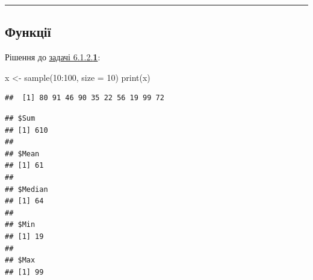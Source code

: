 \documentclass[
]{book}
\newenvironment{Shaded}{\begin{snugshade}}{\end{snugshade}}
\newcommand{\AttributeTok}[1]{\textcolor[rgb]{0.77,0.63,0.00}{#1}}
\newcommand{\ControlFlowTok}[1]{\textcolor[rgb]{0.13,0.29,0.53}{\textbf{#1}}}
\newcommand{\DecValTok}[1]{\textcolor[rgb]{0.00,0.00,0.81}{#1}}
\newcommand{\FunctionTok}[1]{\textcolor[rgb]{0.00,0.00,0.00}{#1}}
\newcommand{\NormalTok}[1]{#1}
\newcommand{\OtherTok}[1]{\textcolor[rgb]{0.56,0.35,0.01}{#1}}
\newcommand{\SpecialCharTok}[1]{\textcolor[rgb]{0.00,0.00,0.00}{#1}}
\begin{document}
\begin{center}\rule{0.5\linewidth}{0.5pt}\end{center}

\hypertarget{chapter622}{%
\subsection{Функції}\label{chapter622}}

Рішення до \protect\hyperlink{task6121}{задачі 6.1.2.\textbf{1}}:

\begin{Shaded}
\begin{Highlighting}[]
\NormalTok{x }\OtherTok{\textless{}{-}} \FunctionTok{sample}\NormalTok{(}\DecValTok{10}\SpecialCharTok{:}\DecValTok{100}\NormalTok{, }\AttributeTok{size =} \DecValTok{10}\NormalTok{)}
\FunctionTok{print}\NormalTok{(x)}
\end{Highlighting}
\end{Shaded}

\begin{verbatim}
##  [1] 80 91 46 90 35 22 56 19 99 72
\end{verbatim}

\begin{Shaded}
\end{Shaded}

\begin{verbatim}
## $Sum
## [1] 610
## 
## $Mean
## [1] 61
## 
## $Median
## [1] 64
## 
## $Min
## [1] 19
## 
## $Max
## [1] 99
\end{verbatim}
\end{document}
